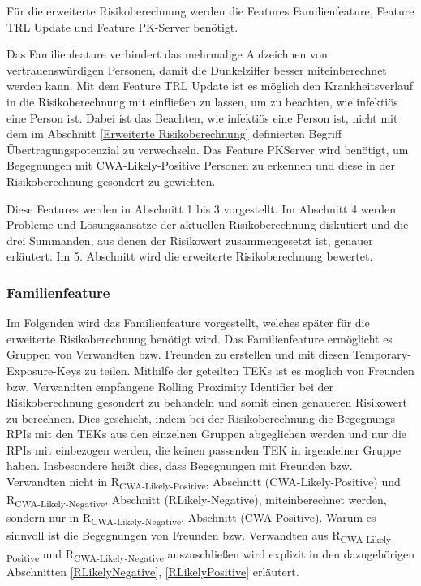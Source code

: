 \documentclass[conference]{IEEEtran}
\begin{document}
Für die erweiterte Risikoberechnung werden die Features Familienfeature, Feature TRL Update und
Feature PK-Server benötigt.

Das Familienfeature verhindert das mehrmalige Aufzeichnen von vertrauenswürdigen Personen,
damit die Dunkelziffer besser miteinberechnet werden kann.
Mit dem Feature TRL Update ist es möglich den Krankheitsverlauf in die Risikoberechnung mit einfließen zu lassen,
um zu beachten, wie infektiös eine Person ist.
Dabei ist das Beachten, wie infektiös eine Person ist, nicht mit dem im Abschnitt \ref{Erweiterte Risikoberechnung} definierten Begriff Übertragungspotenzial zu verwechseln.
Das Feature PKServer wird benötigt, um Begegnungen mit CWA-Likely-Positive Personen zu erkennen und diese in der Risikoberechnung gesondert zu gewichten.

Diese Features werden in Abschnitt 1 bis 3 vorgestellt.
Im Abschnitt 4 werden Probleme und Lösungsansätze der aktuellen Risikoberechnung diskutiert und die drei Summanden, aus denen der Risikowert zusammengesetzt ist, genauer erläutert.
Im 5. Abschnitt wird die erweiterte Risikoberechnung bewertet.
\\
\subsubsection{Familienfeature}
\label{Familienfeature}
Im Folgenden wird das Familienfeature vorgestellt, welches später für die erweiterte Risikoberechnung benötigt wird.
Das Familienfeature ermöglicht es Gruppen von Verwandten bzw. Freunden zu erstellen und mit diesen Temporary-Exposure-Keys zu teilen.
Mithilfe der geteilten TEKs ist es möglich von Freunden bzw. Verwandten empfangene Rolling Proximity Identifier bei der Risikoberechnung gesondert zu behandeln und somit einen genaueren Risikowert zu berechnen.
Dies geschieht, indem bei der Risikoberechnung die Begegnungs RPIs mit den TEKs aus den einzelnen Gruppen abgeglichen werden und nur die RPIs mit einbezogen werden, die keinen passenden TEK in irgendeiner Gruppe haben.
Insbesondere heißt dies, dass Begegnungen mit Freunden bzw. Verwandten nicht in R\textsubscript{CWA-Likely-Positive}, Abschnitt (CWA-Likely-Positive) und R\textsubscript{CWA-Likely-Negative}, Abschnitt (RLikely-Negative), miteinberechnet werden, sondern nur in R\textsubscript{CWA-Likely-Negative}, Abschnitt (CWA-Positive).
Warum es sinnvoll ist die Begegnungen von Freunden bzw. Verwandten aus R\textsubscript{CWA-Likely-Positive} und R\textsubscript{CWA-Likely-Negative} auszuschließen wird explizit in den dazugehörigen Abschnitten \ref{RLikelyNegative}, \ref{RLikelyPositive} erläutert.
\end{document}
